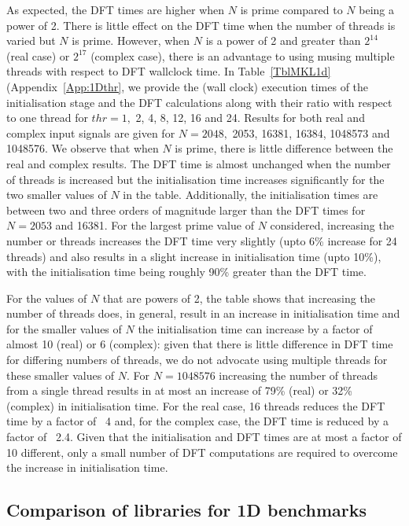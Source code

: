 \documentclass[a4paper]{article}
\begin{document}
As expected, the DFT times are higher when $N$ is prime compared to
$N$ being a power of 2. There is little effect on the DFT time when
the number of threads is varied but $N$ is prime. However, when $N$ is
a power of 2 and greater than $2^{14}$ (real case) or $2^{17}$
(complex case), there is an advantage to using musing multiple threads
with respect to DFT wallclock time. In Table~\ref{TblMKL1d}
(Appendix~\ref{App:1Dthr}, we provide the (wall clock) execution times
of the initialisation stage and the DFT calculations along with their
ratio with respect to one thread for $thr=1,$ 2, 4, 8, 12, 16 and
24. Results for both real and complex input signals are given for
$N=2048,$ 2053, 16381, 16384, 1048573 and 1048576. We observe that
when $N$ is prime, there is little difference between the real and
complex results. The DFT time is almost unchanged when the number of
threads is increased but the initialisation time increases
significantly for the two smaller values of $N$ in the
table. Additionally, the initialisation times are between two and
three orders of magnitude larger than the DFT times for $N=2053$ and
16381. For the largest prime value of $N$ considered, increasing the
number or threads increases the DFT time very slightly (upto 6\%
increase for 24 threads) and also results in a slight increase in
initialisation time (upto 10\%), with the initialisation time being
roughly 90\% greater than the DFT time.

For the values of $N$ that are powers of 2, the table shows that
increasing the number of threads does, in general, result in an
increase in initialisation time and for the smaller values of $N$ the
initialisation time can increase by a factor of almost 10 (real) or 6
(complex): given that there is little difference in DFT time for
differing numbers of threads, we do not advocate using multiple
threads for these smaller values of $N.$ For $N=1048576$ increasing
the number of threads from a single thread results in at most an
increase of 79\% (real) or 32\% (complex) in initialisation time. For
the real case, 16 threads reduces the DFT time by a factor of ~4 and,
for the complex case, the DFT time is reduced by a factor of
~2.4. Given that the initialisation and DFT times are at most a factor
of 10 different, only a small number of DFT computations are required
to overcome the increase in initialisation time.








\subsection{Comparison of libraries for 1D benchmarks}\label{Sec:1DComp}
\end{document}
